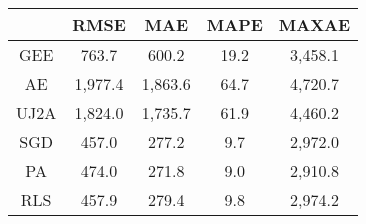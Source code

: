 \begin{tabular}{ccccc}
\toprule
{} &     RMSE &      MAE &  MAPE &    MAXAE \\
\midrule
GEE  &    763.7 &    600.2 &  19.2 &  3,458.1 \\
AE   &  1,977.4 &  1,863.6 &  64.7 &  4,720.7 \\
UJ2A &  1,824.0 &  1,735.7 &  61.9 &  4,460.2 \\
SGD  &    457.0 &    277.2 &   9.7 &  2,972.0 \\
PA   &    474.0 &    271.8 &   9.0 &  2,910.8 \\
RLS  &    457.9 &    279.4 &   9.8 &  2,974.2 \\
\bottomrule
\end{tabular}
